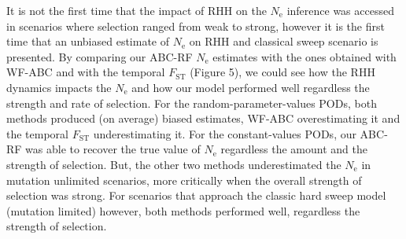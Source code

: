 \documentclass[a4paper, 12pt]{article}
\begin{document}
It is not the first time that the impact of RHH on the $N_{\mathrm{e}}$ inference \citep{Lange:2018fl} was accessed in scenarios where selection ranged from weak to strong, however it is the first time that an unbiased estimate of $N_{\mathrm{e}}$ on RHH and classical sweep scenario is presented. By comparing our ABC-RF $N_{\mathrm{e}}$ estimates with the ones obtained with WF-ABC \citep{Foll:2014kv,Foll:2015ce} and with the temporal $F_{\mathrm{ST}}$ (Figure 5), we could see how the RHH dynamics impacts the $N_{\mathrm{e}}$ and how our model performed well regardless the strength and rate of selection. For the random-parameter-values PODs, both methods produced (on average) biased estimates, WF-ABC overestimating it and the temporal $F_{\mathrm{ST}}$ underestimating it. For the constant-values PODs, our ABC-RF was able to recover the true value of $N_{\mathrm{e}}$ regardless the amount and the strength of selection. But, the other two methods underestimated the $N_{\mathrm{e}}$ in mutation unlimited scenarios, more critically when the overall strength of selection was strong. For scenarios that approach the classic hard sweep model (mutation limited) however, both methods performed well, regardless the strength of selection. 
\end{document}
